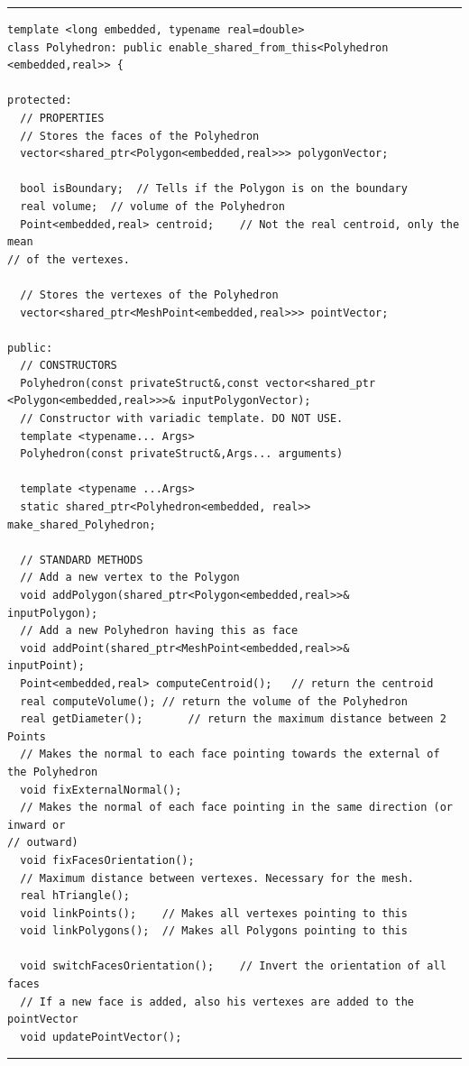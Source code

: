\noindent\rule{16cm}{1pt}
\begin{lstlisting}[caption=File \texttt{Polyhedron.h}]
template <long embedded, typename real=double>
class Polyhedron: public enable_shared_from_this<Polyhedron
<embedded,real>> {

protected:
  // PROPERTIES
  // Stores the faces of the Polyhedron
  vector<shared_ptr<Polygon<embedded,real>>> polygonVector; 
	
  bool isBoundary;	// Tells if the Polygon is on the boundary
  real volume;	// volume of the Polyhedron
  Point<embedded,real> centroid;	// Not the real centroid, only the mean
// of the vertexes.

  // Stores the vertexes of the Polyhedron
  vector<shared_ptr<MeshPoint<embedded,real>>> pointVector;	

public:
  // CONSTRUCTORS
  Polyhedron(const privateStruct&,const vector<shared_ptr
<Polygon<embedded,real>>>& inputPolygonVector);
  // Constructor with variadic template. DO NOT USE.
  template <typename... Args>
  Polyhedron(const privateStruct&,Args... arguments)

  template <typename ...Args>
  static shared_ptr<Polyhedron<embedded, real>>
make_shared_Polyhedron;

  // STANDARD METHODS
  // Add a new vertex to the Polygon
  void addPolygon(shared_ptr<Polygon<embedded,real>>& 
inputPolygon);
  // Add a new Polyhedron having this as face
  void addPoint(shared_ptr<MeshPoint<embedded,real>>& 
inputPoint);
  Point<embedded,real> computeCentroid();	// return the centroid
  real computeVolume();	// return the volume of the Polyhedron
  real getDiameter();		// return the maximum distance between 2 Points
  // Makes the normal to each face pointing towards the external of the Polyhedron
  void fixExternalNormal();	
  // Makes the normal of each face pointing in the same direction (or inward or 
// outward)
  void fixFacesOrientation();	
  // Maximum distance between vertexes. Necessary for the mesh.
  real hTriangle();	
  void linkPoints();	// Makes all vertexes pointing to this
  void linkPolygons();  // Makes all Polygons pointing to this

  void switchFacesOrientation();	// Invert the orientation of all faces
  // If a new face is added, also his vertexes are added to the pointVector
  void updatePointVector();
\end{lstlisting}
\noindent\rule{16cm}{1pt}\\

